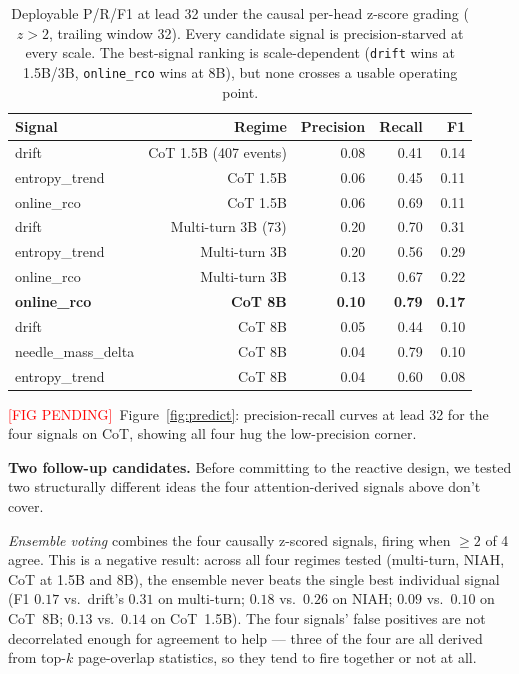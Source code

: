 \documentclass[11pt]{article}
\newcommand{\NEEDFIG}{\textcolor{red}{[FIG PENDING]}}
\begin{document}
\begin{table}[t]
\centering
\small
\begin{tabular}{lrrrr}
\toprule
Signal & Regime & Precision & Recall & F1 \\
\midrule
drift        & CoT 1.5B (407 events) & 0.08 & 0.41 & 0.14 \\
entropy\_trend & CoT 1.5B             & 0.06 & 0.45 & 0.11 \\
online\_rco  & CoT 1.5B               & 0.06 & 0.69 & 0.11 \\
\midrule
drift        & Multi-turn 3B (73)    & 0.20 & 0.70 & 0.31 \\
entropy\_trend & Multi-turn 3B       & 0.20 & 0.56 & 0.29 \\
online\_rco  & Multi-turn 3B         & 0.13 & 0.67 & 0.22 \\
\midrule
\textbf{online\_rco}   & \textbf{CoT 8B} & \textbf{0.10} & \textbf{0.79} & \textbf{0.17} \\
drift                  & CoT 8B          & 0.05 & 0.44 & 0.10 \\
needle\_mass\_delta    & CoT 8B          & 0.04 & 0.79 & 0.10 \\
entropy\_trend         & CoT 8B          & 0.04 & 0.60 & 0.08 \\
\bottomrule
\end{tabular}
\caption{Deployable P/R/F1 at lead 32 under the causal per-head z-score
grading ($z > 2$, trailing window 32). Every candidate signal is
precision-starved at every scale. The best-signal ranking is
scale-dependent (\texttt{drift} wins at 1.5B/3B, \texttt{online\_rco}
wins at 8B), but none crosses a usable operating point.}
\label{tab:predict}
\end{table}

\NEEDFIG~Figure~\ref{fig:predict}: precision-recall curves at lead 32
for the four signals on CoT, showing all four hug the low-precision
corner.

\textbf{Two follow-up candidates.} Before committing to the reactive
design, we tested two structurally different ideas the four
attention-derived signals above don't cover.

\emph{Ensemble voting} combines the four causally z-scored signals,
firing when $\geq 2$ of 4 agree. This is a negative result: across all
four regimes tested (multi-turn, NIAH, CoT at 1.5B and 8B), the ensemble
never beats the single best individual signal (F1 $0.17$ vs.\ drift's
$0.31$ on multi-turn; $0.18$ vs.\ $0.26$ on NIAH; $0.09$ vs.\ $0.10$ on
CoT~8B; $0.13$ vs.\ $0.14$ on CoT~1.5B). The four signals' false
positives are not decorrelated enough for agreement to help --- three of
the four are all derived from top-$k$ page-overlap statistics, so they
tend to fire together or not at all.
\end{document}
